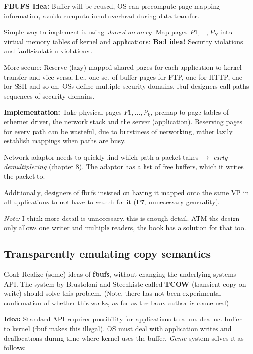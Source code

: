 \textbf{FBUFS Idea:} Buffer will be reused, OS can precompute page mapping information, avoids computational overhead during data transfer.

Simple way to implement is using \textit{shared memory}. Map pages $P1,\dots ,P_N$ into virtual memory tables of kernel and applications: \textbf{Bad idea!} Security violations and fault-isolation violations..

More secure: Reserve (lazy) mapped shared pages for each application-to-kernel transfer and vice versa. I.e., one set of buffer pages for FTP, one for HTTP, one for SSH and so on. OSs define multiple security domains, fbuf designers call paths sequences of security domains.

\textbf{Implementation:} Take physical pages $P1, \dots , P_k$, premap to page tables of ethernet driver, the network stack and the server (application). Reserving pages for every path can be wasteful, due to burstiness of networking, rather lazily establish mappings when paths are busy.

Network adaptor needs to quickly find which path a packet takes $\rightarrow$ \textit{early demultiplexing} (chapter 8). The adaptor has a list of free buffers, which it writes the packet to.

Additionally, designers of fbufs insisted on having it mapped onto the same VP in all applications to not have to search for it (P7, unnecessary generality).

\textit{Note:} I think more detail is unnecessary, this is enough detail. ATM the design only allows one writer and multiple readers, the book has a solution for that too.

\subsection{Transparently emulating copy semantics}

Goal: Realize (some) ideas of \textbf{fbufs}, without changing the underlying systems API. The system by Brustoloni and Steenkiste called \textbf{TCOW} (transient copy on write) should solve this problem. (Note, there has not been experimental confirmation of whether this works, as far as the book author is concerned)

\textbf{Idea:} Standard API requires possibility for applications to alloc. dealloc. buffer to kernel (fbuf makes this illegal). OS must deal with application writes and deallocations during time where kernel uses the buffer. \textit{Genie} system solves it as follows:

